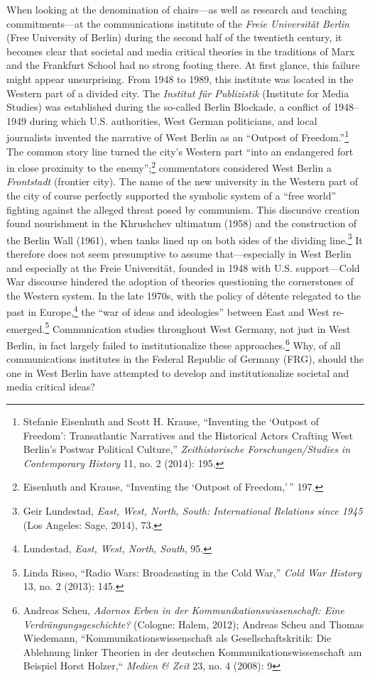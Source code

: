 \documentclass{tufte-handout}
\begin{document}
When looking at the denomination of chairs---as well as research and
teaching commitments---at the communications institute of the
\emph{Freie Universität Berlin} (Free University of Berlin) during the
second half of the twentieth century, it becomes clear that societal and
media critical theories in the traditions of Marx and the Frankfurt
School had no strong footing there. At first glance, this failure might
appear unsurprising. From 1948 to 1989, this institute was located in
the Western part of a divided city. The \emph{Institut für Publizistik}
(Institute for Media Studies) was established during the so-called
Berlin Blockade, a conflict of 1948--1949 during which U.S. authorities,
West German politicians, and local journalists invented the narrative of
West Berlin as an ``Outpost of Freedom.''\footnote{Stefanie Eisenhuth
  and Scott H. Krause, ``Inventing the `Outpost of Freedom':
  Transatlantic Narratives and the Historical Actors Crafting West
  Berlin's Postwar Political Culture,'' \emph{Zeithistorische
  Forschungen/Studies in Contemporary History} 11, no. 2 (2014): 195.}
The common story line turned the city's Western part ``into an
endangered fort in close proximity to the enemy'';\footnote{Eisenhuth
  and Krause, ``Inventing the `Outpost of Freedom,'\,'' 197.}
commentators considered West Berlin a \emph{Frontstadt} (frontier city).
The name of the new university in the Western part of the city of course
perfectly supported the symbolic system of a ``free world'' fighting
against the alleged threat posed by communism. This discursive creation
found nourishment in the Khrushchev ultimatum (1958) and the
construction of the Berlin Wall (1961), when tanks lined up on both
sides of the dividing line.\footnote{Geir Lundestad, \emph{East, West,
  North, South: International Relations since 1945} (Los Angeles: Sage,
  2014), 73.} It therefore does not seem presumptive to assume
that---especially in West Berlin and especially at the Freie
Universität, founded in 1948 with U.S. support---Cold War discourse
hindered the adoption of theories questioning the cornerstones of the
Western system. In the late 1970s, with the policy of détente relegated
to the past in Europe,\footnote{Lundestad, \emph{East, West, North,
  South}, 95.} the ``war of ideas and ideologies'' between East and West
re-emerged.\footnote{Linda Risso, ``Radio Wars: Broadcasting in the Cold
  War,'' \emph{Cold War History} 13, no. 2 (2013): 145.} Communication
studies throughout West Germany, not just in West Berlin, in fact
largely failed to institutionalize these approaches.\footnote{Andreas
  Scheu, \emph{Adornos Erben in der Kommunikationswissenschaft: Eine
  Verdrängungsgeschichte?} (Cologne: Halem, 2012); Andreas Scheu and
  Thomas Wiedemann, ``Kommunikationswissenschaft als
  Gesellschaftskritik: Die Ablehnung linker Theorien in der deutschen
  Kommunikationswissenschaft am Beispiel Horst Holzer,`` \emph{Medien \&
  Zeit} 23, no. 4 (2008): 9} Why, of all communications institutes in
the Federal Republic of Germany (FRG), should the one in West Berlin
have attempted to develop and institutionalize societal and media
critical ideas?
\end{document}
